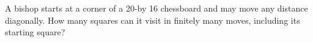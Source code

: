 A bishop starts at a corner of a 20-by 16 chessboard and may move any distance diagonally. How many squares can it visit in finitely many moves, including its starting square?
